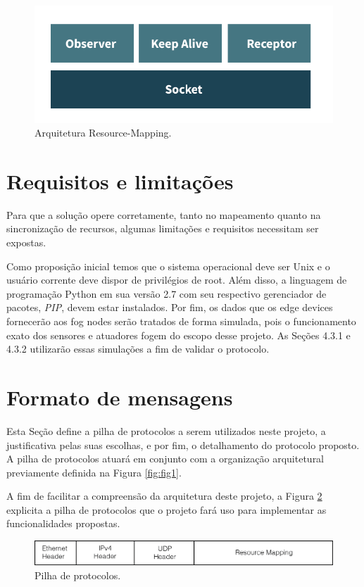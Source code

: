 \begin{figure}[H]
    \centering\includegraphics[width=.5\textwidth]{fig16.png}
    \caption[Arquitetura Resource-Mapping]
    {\label{fig:fig16} Arquitetura Resource-Mapping.}
\end{figure}


\section{Requisitos e limitações}

Para que a solução opere corretamente, tanto no mapeamento quanto na sincronização de recursos, algumas limitações e requisitos necessitam ser expostas.

Como proposição inicial temos que o sistema operacional deve ser Unix e o usuário corrente deve dispor de privilégios de root.
Além disso, a linguagem de programação Python em sua versão 2.7 com seu respectivo gerenciador de pacotes, \textit{PIP}\cite{pip}, devem estar instalados.
Por fim, os dados que os edge devices fornecerão aos fog nodes serão tratados de forma simulada, pois o funcionamento exato dos sensores e atuadores
fogem do escopo desse projeto. As Seções 4.3.1 e 4.3.2 utilizarão essas simulações a fim de validar o protocolo.


\section{Formato de mensagens}

Esta Seção define a pilha de protocolos a serem utilizados neste projeto, a justificativa pelas suas escolhas, e por fim, o detalhamento do protocolo proposto.
A pilha de protocolos atuará em conjunto com a organização arquitetural previamente definida na Figura \ref{fig:fig1}.

A fim de facilitar a compreensão da arquitetura deste projeto, a Figura \ref{fig:fig2} explicita a pilha de protocolos que o projeto fará uso para implementar as funcionalidades propostas.

\begin{figure}[htb!]
    \centering\includegraphics[width=.8\textwidth]{fig2.png}
    \caption[Pilha de protocolos]
    {\label{fig:fig2} Pilha de protocolos.}
\end{figure}

